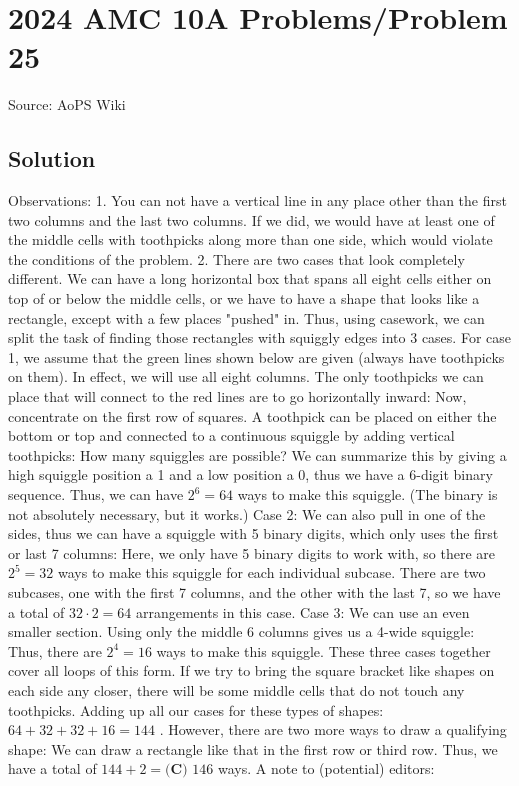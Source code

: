 \documentclass[12pt]{article}
\begin{document}
\section*{{2024 AMC 10A Problems/Problem 25}}
Source: AoPS Wiki

\subsection*{Solution}
Observations: 1. You can not have a vertical line in any place other than the first two columns and the last two columns. If we did, we would have at least one of the middle cells with toothpicks along more than one side, which would violate the conditions of the problem. 2. There are two cases that look completely different. We can have a long horizontal box that spans all eight cells either on top of or below the middle cells, or we have to have a shape that looks like a rectangle, except with a few places "pushed" in. Thus, using casework, we can split the task of finding those rectangles with squiggly edges into 3 cases. For case 1, we assume that the green lines shown below are given (always have toothpicks on them). In effect, we will use all eight columns. The only toothpicks we can place that will connect to the red lines are to go horizontally inward: Now, concentrate on the first row of squares. A toothpick can be placed on either the bottom or top and connected to a continuous squiggle by adding vertical toothpicks: How many squiggles are possible? We can summarize this by giving a high squiggle position a 1 and a low position a 0, thus we have a 6-digit binary sequence. Thus, we can have $2^6=64$ ways to make this squiggle. (The binary is not absolutely necessary, but it works.) Case 2: We can also pull in one of the sides, thus we can have a squiggle with 5 binary digits, which only uses the first or last 7 columns: Here, we only have 5 binary digits to work with, so there are $2^5=32$ ways to make this squiggle for each individual subcase. There are two subcases, one with the first 7 columns, and the other with the last 7, so we have a total of $32\cdot 2 = 64$ arrangements in this case. Case 3: We can use an even smaller section. Using only the middle 6 columns gives us a 4-wide squiggle: Thus, there are $2^4=16$ ways to make this squiggle. These three cases together cover all loops of this form. If we try to bring the square bracket like shapes on each side any closer, there will be some middle cells that do not touch any toothpicks. Adding up all our cases for these types of shapes: $64+32+32+16=144$ . However, there are two more ways to draw a qualifying shape: We can draw a rectangle like that in the first row or third row. Thus, we have a total of $144+2=\boxed{\textbf{(C) }146}$ ways. A note to (potential) editors:
\end{document}
